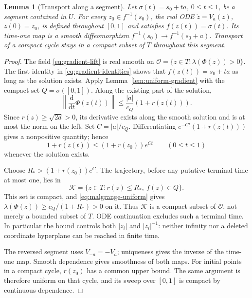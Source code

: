 \documentclass[11pt]{article}
\numberwithin{equation}{section}
\newtheorem{lemma}[theorem]{Lemma}
\theoremstyle{definition}
\theoremstyle{remark}
\newcommand{\dd}{\mathrm d}
\begin{document}
\begin{lemma}[Transport along a segment]\label{lem:complete-segment}
Let $\sigma(t)=s_0+ta$, $0\le t\le1$, be a segment contained in $U$.
For every $z_0\in f^{-1}(s_0)$, the real ODE
$\dot z=V_a(z)$, $z(0)=z_0$, is defined throughout $[0,1]$ and satisfies
$f(z(t))=\sigma(t)$. Its time-one map is a smooth diffeomorphism
$f^{-1}(s_0)\to f^{-1}(s_0+a)$. Transport of a compact cycle stays
in a compact subset of $T$ throughout this segment.
\end{lemma}
\begin{proof}
The field \eqref{eq:gradient-lift} is real smooth on
$\mathcal O=\{z\in T:\lambda(\Phi(z))>0\}$. The first identity in
\eqref{eq:gradient-identities} shows that $f(z(t))=s_0+ta$ as long as
the solution exists. Apply Lemma~\ref{lem:uniform-gradient} with the
compact set $Q=\sigma([0,1])$. Along the existing part of the solution,
\begin{equation}\label{eq:embedded-growth}
 \left\|\frac{\dd}{\dd t}\Phi(z(t))\right\|
 \le\frac{|a|}{c_Q}(1+r(z(t))).
\end{equation}
Since $r(z)\ge\sqrt{2d}>0$, its derivative exists along the smooth
solution and is at most the norm on the left. Set $C=|a|/c_Q$.
Differentiating $e^{-Ct}(1+r(z(t)))$ gives a nonpositive quantity;
hence
\begin{equation}\label{eq:gronwall-radius}
 1+r(z(t))\le(1+r(z_0))e^{Ct}\qquad(0\le t\le1)
\end{equation}
whenever the solution exists.

Choose $R_*> (1+r(z_0))e^C$. The trajectory, before any putative
terminal time at most one, lies in
\[
 \mathcal K=\{z\in T:r(z)\le R_*,\ f(z)\in Q\}.
\]
This set is compact, and \eqref{eq:malgrange-uniform} gives
$\lambda(\Phi(z))\ge c_Q/(1+R_*)>0$ on it. Thus $\mathcal K$ is a
compact subset of $\mathcal O$, not merely a bounded subset of $T$.
ODE continuation excludes such a terminal time. In particular the bound
controls both $|z_i|$ and $|z_i|^{-1}$: neither infinity nor a deleted
coordinate hyperplane can be reached in finite time.

The reversed segment uses $V_{-a}=-V_a$; uniqueness gives the inverse
of the time-one map. Smooth dependence gives smoothness of both maps.
For initial points in a compact cycle, $r(z_0)$ has a common upper
bound. The same argument is therefore uniform on that cycle, and its
sweep over $[0,1]$ is compact by continuous dependence.
\end{proof}
\end{document}
